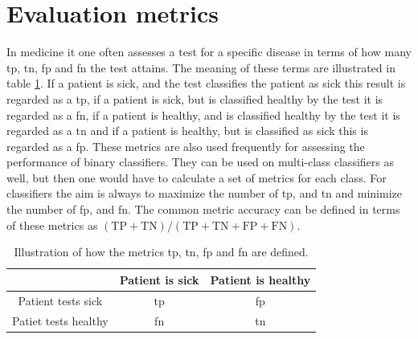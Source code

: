 \section{Evaluation metrics}
In medicine it one often assesses a test for a specific disease in terms of how many \acrfull{tp}, \acrfull{tn}, \acrfull{fp} and \acrfull{fn} the test attains. The meaning of these terms are illustrated in table \ref{tab:ttpnffpn}. If a patient is sick, and the test classifies the patient as sick this result is regarded as a \acrlong{tp}, if a patient is sick, but is classified healthy by the test it is regarded as a \acrlong{fn}, if a patient is healthy, and is classified healthy by the test it is regarded as a \acrlong{tn} and if a patient is healthy, but is classified as sick this is regarded as a \acrlong{fp}. These metrics are also used frequently for assessing the performance of binary classifiers. They can be used on multi-class classifiers as well, but then one would have to calculate a set of metrics for each class. For classifiers the aim is always to maximize the number of \acrshort{tp}, and \acrshort{tn} and minimize the number of \acrshort{fp}, and \acrshort{fn}. The common metric accuracy can be defined in terms of these metrics as $(\mathrm{TP} + \mathrm{TN}) / (\mathrm{TP} + \mathrm{TN} + \mathrm{FP} + \mathrm{FN})$.

\begin{table}
    \centering
    \begin{tabular}{c|c|c|}
        \toprule
                             & Patient is sick & Patient is healthy \\
        \midrule
        Patient tests sick   & \acrshort{tp}   & \acrshort{fp} \\
        \midrule
        Patiet tests healthy & \acrshort{fn}   & \acrshort{tn} \\
        \bottomrule
    \end{tabular}
    \caption{Illustration of how the metrics \acrshort{tp}, \acrshort{tn}, \acrfull{fp} and \acrfull{fn} are defined.}
    \label{tab:ttpnffpn}
\end{table}

